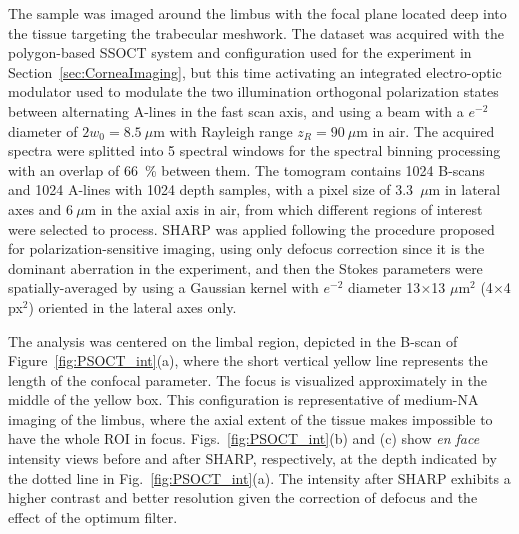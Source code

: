 The sample was imaged around the limbus with the focal plane located deep into the tissue targeting the trabecular meshwork. The dataset was acquired with the polygon-based SSOCT system and configuration used for the experiment in Section~\ref{sec:CorneaImaging}, but this time activating an integrated electro-optic modulator used to modulate the two illumination orthogonal polarization states between alternating A-lines in the fast scan axis, and using a beam with a $e^{-2}$ diameter of $2w_0=8.5~\mu$m with Rayleigh range $z_R=90~\mu$m in air. The acquired spectra were splitted into 5 spectral windows for the spectral binning processing with an overlap of 66~\% between them. The tomogram contains 1024 B-scans and 1024 A-lines with 1024 depth samples, with a pixel size of 3.3~$\mu$m in lateral axes and $6~\mu$m in the axial axis in air, from which different regions of interest were selected to process. SHARP was applied following the procedure proposed for polarization-sensitive imaging, using only defocus correction since it is the dominant aberration in the experiment, and then the Stokes parameters were spatially-averaged by using a Gaussian kernel with $e^{-2}$ diameter 13$\times$13 $\mu$m$^2$ (4$\times$4 px$^2$) oriented in the lateral axes only.

The analysis was centered on the limbal region, depicted in the B-scan of Figure~\ref{fig:PSOCT_int}(a), where the short vertical yellow line represents the length of the confocal parameter. The focus is visualized approximately in the middle of the yellow box. This configuration is representative of medium-NA imaging of the limbus, where the axial extent of the tissue makes impossible to have the whole ROI in focus. Figs.~\ref{fig:PSOCT_int}(b) and (c) show \textit{en face} intensity views before and after SHARP, respectively, at the depth indicated by the dotted line in Fig.~\ref{fig:PSOCT_int}(a). The intensity after SHARP exhibits a higher contrast and better resolution given the correction of defocus and the effect of the optimum filter.

